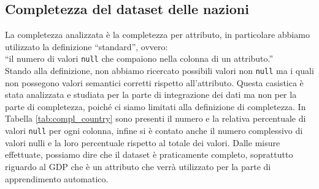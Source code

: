 \subsection{Completezza del dataset delle nazioni}
La completezza analizzata è la completezza per attributo, in particolare abbiamo utilizzato la definizione “standard”, ovvero:\\“il numero di valori  \texttt{null} che compaiono nella colonna di un attributo.”\\
Stando alla definizione, non abbiamo ricercato possibili valori non \texttt{null} ma i quali non possegono valori semantici corretti rispetto all'attributo.
Questa casistica è stata analizzata e studiata per la parte di integrazione dei dati ma non per la parte di completezza, poiché ci siamo limitati alla definizione di completezza. 
In Tabella \ref{tab:compl_country} sono presenti il numero e la relativa percentuale di valori \texttt{null} per ogni colonna, infine si è contato anche il numero complessivo di valori nulli e la loro percentuale rispetto al totale dei valori.
Dalle misure effettuate, possiamo dire che il dataset è praticamente completo, soprattutto riguardo al GDP che è un attributo che verrà utilizzato per la parte di apprendimento automatico.
